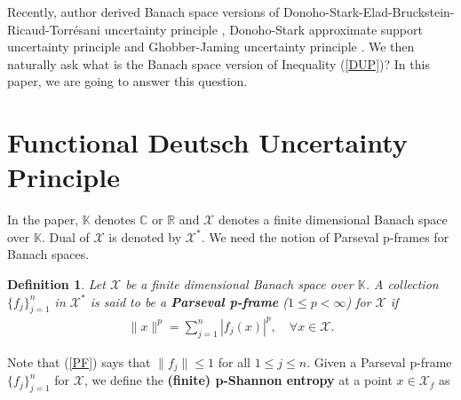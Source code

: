 \documentclass{amsart}
\newtheorem{definition}[theorem]{Definition}
\begin{document}
Recently, author derived Banach space versions of  Donoho-Stark-Elad-Bruckstein-Ricaud-Torrésani uncertainty principle \cite{KRISHNA1},  Donoho-Stark approximate support  uncertainty principle \cite{KRISHNA3} and Ghobber-Jaming uncertainty principle \cite{KRISHNA2}. We then naturally ask what is the Banach space version of Inequality (\ref{DUP})?
In this paper, we are going to answer this question. 


\section{Functional Deutsch   Uncertainty Principle}
In the paper,   $\mathbb{K}$ denotes $\mathbb{C}$ or $\mathbb{R}$ and $\mathcal{X}$ denotes a  finite dimensional Banach space over $\mathbb{K}$. Dual of $\mathcal{X}$ is denoted by $\mathcal{X}^*$. We need the notion of Parseval p-frames for Banach spaces.
\begin{definition}\cite{ALDROUBISUNTANG, CHRISTENSENSTOEVA}\label{A}
	Let $\mathcal{X}$  be a  finite dimensional Banach space over $\mathbb{K}$.  A collection $\{f_j\}_{j=1}^n$  in  $\mathcal{X}^*$  is said to be a \textbf{Parseval p-frame} ($1\leq p <\infty$) for $\mathcal{X}$ if
			\begin{align}\label{PF}
			\|x\|^p=\sum_{j=1}^n|f_j(x)|^p, \quad \forall x \in \mathcal{X}.
		\end{align}
\end{definition}
Note that (\ref{PF}) says that $\|f_j\|\leq 1$ for all $1\leq j \leq n$. Given a Parseval p-frame $\{f_j\}_{j=1}^n$   for $\mathcal{X}$, we define the \textbf{(finite) p-Shannon entropy} at a point $x \in \mathcal{X}_f$ as 
\end{document}
